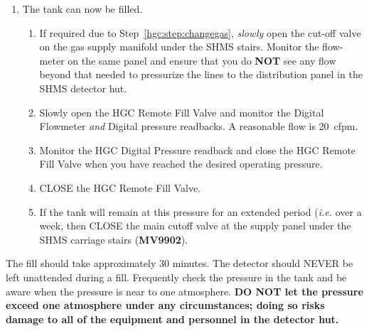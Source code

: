 {\begin{enumerate}
  \item The tank can now be filled.
  \begin{enumerate}
    \item If required due to Step~\ref{hgc:step:changegas}, \emph{slowly} open
      the cut-off valve on the gas supply manifold under the SHMS stairs.
      Monitor the flow-meter on the same panel and ensure that you do
      \textbf{NOT} see any flow beyond that needed to pressurize the lines to
      the distribution panel in the SHMS detector hut.
    \item Slowly open the HGC Remote Fill Valve and monitor the Digital Flowmeter
      \emph{and} Digital pressure readbacks.  A reasonable flow is 20~cfpm.
    \item Monitor the HGC Digital Pressure readback and close the HGC Remote
      Fill Valve when you have reached the desired operating pressure.
    \item CLOSE the HGC Remote Fill Valve.
    \item If the tank will remain at this pressure for an extended period
      (\emph{i.e.} over a week, then CLOSE the main cutoff valve at the supply
      panel under the SHMS carriage stairs (\textbf{MV9902}).
  \end{enumerate}
\end{enumerate}

The fill should take approximately 30 minutes.  The detector should NEVER be
left unattended during a fill.  Frequently check the pressure in the tank and
be aware when the pressure is near to one atmosphere.  \textbf{DO NOT let the
  pressure exceed one atmosphere under any circumstances; doing so risks damage
to all of the equipment and personnel in the detector hut.}




}%
